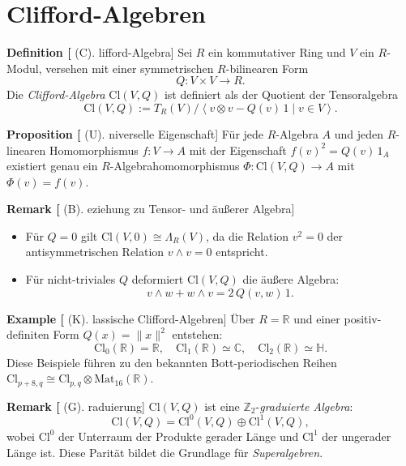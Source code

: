\documentclass[10pt, letterpaper]{article}
\newcommand{\Cl}{\mathrm{Cl}}
\newcommand{\Mat}{\mathrm{Mat}}
\newcommand{\CustomHeading}[3]{%
  \par\medskip\noindent%
  \textbf{#1 #2} \textnormal{(#3)}.\enskip%
}
\newenvironment{DEF}[2]{\begin{unitbox}\CustomHeading{Definition}{#1}{#2}}{\end{unitbox}}
\newenvironment{PROP}[2]{\begin{unitbox}\CustomHeading{Proposition}{#1}{#2}}{\end{unitbox}}
\newenvironment{REM}[2]{\begin{unitbox}\CustomHeading{Remark}{#1}{#2}}{\end{unitbox}}
\newenvironment{EXA}[2]{\begin{unitbox}\CustomHeading{Example}{#1}{#2}}{\end{unitbox}}
\begin{document}
\section{Clifford-Algebren}
\label{sec:clifford}

\begin{DEF}[Clifford-Algebra]
Sei \(R\) ein kommutativer Ring und \(V\) ein \(R\)-Modul, versehen mit einer
symmetrischen \(R\)-bilinearen Form
\[
Q:V\times V\to R.
\]
Die \emph{Clifford-Algebra} \(\Cl(V,Q)\) ist definiert als der Quotient der Tensoralgebra
\[
\Cl(V,Q):=T_R(V)\big/\left\langle v\otimes v - Q(v)\,1 \mid v\in V \right\rangle.
\]
\end{DEF}

\begin{PROP}[Universelle Eigenschaft]
Für jede \(R\)-Algebra \(A\) und jeden \(R\)-linearen Homomorphismus
\(f:V\to A\) mit der Eigenschaft \(f(v)^2=Q(v)\,1_A\)
existiert genau ein \(R\)-Algebrahomomorphismus
\(\Phi:\Cl(V,Q)\to A\) mit \(\Phi(v)=f(v)\).
\end{PROP}

\begin{REM}[Beziehung zu Tensor- und äußerer Algebra]
\begin{itemize}[leftmargin=*]
\item Für \(Q=0\) gilt \(\Cl(V,0)\cong \Lambda_R(V)\), da die Relation \(v^2=0\) der antisymmetrischen
Relation \(v\wedge v=0\) entspricht.
\item Für nicht-triviales \(Q\) deformiert \(\Cl(V,Q)\) die äußere Algebra:
\[
v\wedge w + w\wedge v = 2\,Q(v,w)\,1.
\]
\end{itemize}
\end{REM}

\begin{EXA}[Klassische Clifford-Algebren]
Über \(R=\mathbb{R}\) und einer positiv-definiten Form \(Q(x)=\|x\|^2\) entstehen:
\[
\Cl_0(\mathbb{R})=\mathbb{R},\quad
\Cl_1(\mathbb{R})\simeq\mathbb{C},\quad
\Cl_2(\mathbb{R})\simeq\mathbb{H}.
\]
Diese Beispiele führen zu den bekannten Bott-periodischen Reihen
\(\Cl_{p+8,q}\cong \Cl_{p,q}\otimes\Mat_{16}(\mathbb{R})\).
\end{EXA}

\begin{REM}[Graduierung]
\(\Cl(V,Q)\) ist eine \(\mathbb{Z}_2\)-\emph{graduierte Algebra}:
\[
\Cl(V,Q)=\Cl^0(V,Q)\oplus \Cl^1(V,Q),
\]
wobei \(\Cl^0\) der Unterraum der Produkte gerader Länge und \(\Cl^1\) der ungerader Länge ist.
Diese Parität bildet die Grundlage für \emph{Superalgebren}.
\end{REM}
\end{document}
